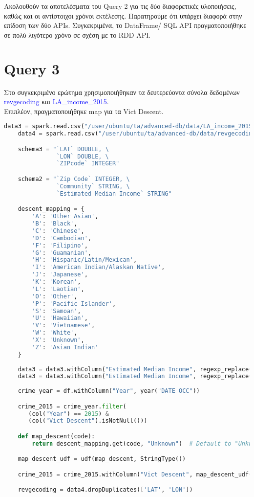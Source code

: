 \documentclass{article}
\begin{document}
Ακολουθούν τα αποτελέσματα του Query 2 για τις δύο διαφορετικές υλοποιήσεις, καθώς και οι αντίστοιχοι χρόνοι εκτέλεσης. Παρατηρούμε ότι υπάρχει διαφορά στην επίδοση των δύο APIs. Συγκεκριμένα, το DataFrame/ SQL API πραγματοποιήθηκε σε πολύ λιγότερο χρόνο σε σχέση με το RDD API. 

\section{Query 3}

Στο συγκεκριμένο ερώτημα χρησιμοποιήθηκαν τα δευτερεύοντα σύνολα δεδομένων 
\textcolor{blue}{revgecoding} και \textcolor{blue}{LA\_income\_2015}. \\
Επιπλέον, πραγματοποιήθηκε map για τα Vict  Descent. \\

\begin{lstlisting}[language = Python]
    data3 = spark.read.csv("/user/ubuntu/ta/advanced-db/data/LA_income_2015.csv", header=True, schema=schema2)
    data4 = spark.read.csv("/user/ubuntu/ta/advanced-db/data/revgecoding.csv", header=True, schema=schema3)

    schema3 = "`LAT` DOUBLE, \
               `LON` DOUBLE, \
               `ZIPcode` INTEGER"

    schema2 = "`Zip Code` INTEGER, \
	           `Community` STRING, \
	           `Estimated Median Income` STRING"

    descent_mapping = {
        'A': 'Other Asian',
        'B': 'Black',
        'C': 'Chinese',
        'D': 'Cambodian',
        'F': 'Filipino',
        'G': 'Guamanian',
        'H': 'Hispanic/Latin/Mexican',
        'I': 'American Indian/Alaskan Native',
        'J': 'Japanese',
        'K': 'Korean',
        'L': 'Laotian',
        'O': 'Other',
        'P': 'Pacific Islander',
        'S': 'Samoan',
        'U': 'Hawaiian',
        'V': 'Vietnamese',
        'W': 'White',
        'X': 'Unknown',
        'Z': 'Asian Indian'
    }
    
    data3 = data3.withColumn("Estimated Median Income", regexp_replace(col("Estimated Median Income"), "\$", ""))
    data3 = data3.withColumn("Estimated Median Income", regexp_replace(col("Estimated Median Income"), ",", "").cast("float"))
     
    crime_year = df.withColumn("Year", year("DATE OCC"))

    crime_2015 = crime_year.filter(
       (col("Year") == 2015) & 
       (col("Vict Descent").isNotNull()))

    def map_descent(code):
        return descent_mapping.get(code, "Unknown")  # Default to "Unknown" if code not found

    map_descent_udf = udf(map_descent, StringType())

    crime_2015 = crime_2015.withColumn("Vict Descent", map_descent_udf(crime_2015["Vict Descent"]))

    revgecoding = data4.dropDuplicates(['LAT', 'LON'])
\end{lstlisting}
\end{document}
